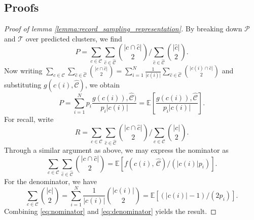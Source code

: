 \documentclass[fontsize=11pt]{article}
\theoremstyle{definition}
\begin{document}
\subsection{Proofs}\label{appendix:proofs}

\begin{proof}[Proof of lemma \ref{lemma:record_sampling_representation}]
By breaking down $\mathcal{P}$ and $\mathcal{T}$ over predicted clusters, we find
\begin{equation}
    P = \sum_{c\in\mathcal{C}} \sum_{\hat c \in \widehat{\mathcal{C}}} {\lvert c \cap \hat c \rvert \choose 2} \Big/ \sum_{\hat c \in \widehat{\mathcal{C}}} {\lvert \hat c \rvert \choose 2}.
\end{equation}
Now writing $\sum_{c \in \mathcal{C}} \sum_{\hat c \in \widehat{\mathcal{C}}}{\lvert c \cap \hat c \rvert \choose 2} = \sum_{i=1}^{N} \frac{1}{\lvert c(i) \rvert} \sum_{\hat c \in \widehat{\mathcal{C}}} {\lvert c(i) \cap \hat c \rvert \choose 2}$ and substituting $g(c(i), \widehat{\mathcal{C}})$, we obtain
\begin{equation}
    P = \sum_{i=1}^N p_i \frac{g(c(i)), \widehat{\mathcal{C}})}{p_i \lvert c(i) \rvert} = \mathbb{E}\left[ \frac{g(c(i)), \widehat{\mathcal{C}}}{p_i \lvert c(i) \rvert} \right].
\end{equation}
For recall, write 
\begin{equation}\label{eq:recall_cluster_form}
    R = \sum_{c\in\mathcal{C}} \sum_{\hat c \in \widehat{\mathcal{C}}} {\lvert c \cap \hat c \rvert \choose 2} \Big/ \sum_{ c \in {\mathcal{C}}} {\lvert c \rvert \choose 2}.
\end{equation}
Through a similar argument as above, we may express the nominator as 
\begin{equation}\label{eq:nominator}
    \sum_{c\in\mathcal{C}} \sum_{\hat c \in \widehat{\mathcal{C}}} {\lvert c \cap \hat c \rvert \choose 2} = \mathbb{E}\left[ f(c(i),\, \widehat{\mathcal{C}})  \big/ (\lvert c(i) \rvert p_i) \right].
\end{equation}
For the denominator, we have
\begin{equation}\label{eq:denominator}
    \sum_{c \in \mathcal{C}} {\lvert c \rvert \choose 2} = \sum_{i=1}^N \frac{1}{\lvert c(i) \rvert}  {\lvert c(i) \rvert \choose 2} = \mathbb{E}[ (\lvert c(i) \rvert - 1)/(2 p_i)].
\end{equation}
Combining \eqref{eq:nominator} and \eqref{eq:denominator} yields the result. 
\end{proof}
\end{document}
